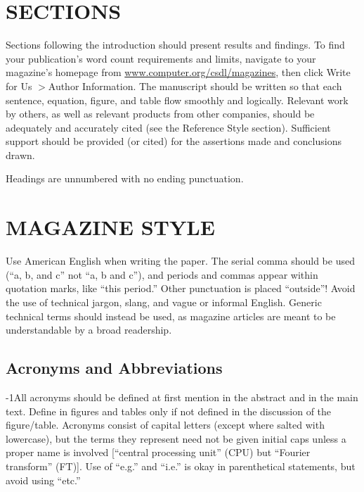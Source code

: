 \documentclass{IEEEcsmag}
\begin{document}
\section{SECTIONS}


Sections following the introduction should present results and findings. To find your\vadjust{\pagebreak} publication's word count requirements and limits, navigate to your magazine's homepage from \href{https://www.computer.org/csdl/magazines}{www.computer.org/csdl/magazines}, then click Write for Us $>$Author Information. The manuscript should be written so that each sentence, equation, figure, and table flow smoothly and logically. Relevant work by others, as well as relevant products from other companies, should be adequately and accurately cited (see the Reference Style section). Sufficient support should be provided (or cited) for the assertions made and conclusions drawn.

Headings are unnumbered with no ending punctuation.\vspace*{-5pt} 



\section{MAGAZINE STYLE}
Use American English when writing the paper. The serial comma should be used (``a, b, and c'' not ``a, b and c''), and periods and commas appear within quotation marks, like ``this period.'' Other punctuation is placed ``outside''! Avoid the use of technical jargon, slang, and vague or informal English. Generic technical terms should instead be used, as magazine articles are meant to be understandable by a broad readership.\vspace*{-5pt}



\subsection{Acronyms and Abbreviations}

\looseness-1All acronyms should be defined at first mention in the abstract and in the main text. Define in figures and tables only if not defined in the discussion of the figure/table. Acronyms consist of capital letters (except where salted with lowercase), but the terms they represent need not be given initial caps unless a proper name is involved [``central processing unit'' (CPU) but ``Fourier transform'' (FT)]. Use of ``e.g.'' and ``i.e.'' is okay in parenthetical statements, but avoid using ``etc.''
\end{document}
